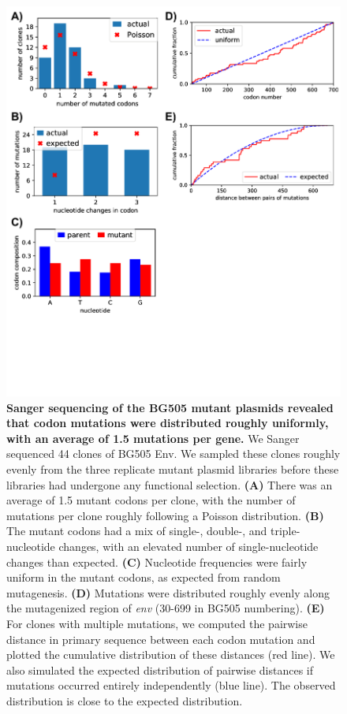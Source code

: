 \documentclass[9pt,lineno]{elife}
\begin{document}
\begin{figure}
\centerline{\includegraphics[width=5in]{figures/sanger_sequencing_supp/sanger_sequencing_supp}}
\caption{\label{suppfig:sanger_sequencing_supp}
{\bf Sanger sequencing of the BG505 mutant plasmids revealed that codon mutations were distributed roughly uniformly, with an average of 1.5 mutations per gene.}
We Sanger sequenced 44 clones of BG505 Env.
We sampled these clones roughly evenly from the three replicate mutant plasmid libraries before these libraries had undergone any functional selection. 
{\bf(A)} There was an average of 1.5 mutant codons per clone, with the number of mutations per clone roughly following a Poisson distribution. 
{\bf(B)} The mutant codons had a mix of single-, double-, and triple-nucleotide changes, with an elevated number of single-nucleotide changes than expected.
{\bf(C)} Nucleotide frequencies were fairly uniform in the mutant codons, as expected from random mutagenesis.
{\bf(D)} Mutations were distributed roughly evenly along the mutagenized region of {\it env} (30-699 in BG505 numbering).
{\bf(E)} For clones with multiple mutations, we computed the pairwise distance in primary sequence between each codon mutation and plotted the cumulative distribution of these distances (red line). 
We also simulated the expected distribution of pairwise distances if mutations occurred entirely independently (blue line). 
The observed distribution is close to the expected distribution.
}
\end{figure}
\end{document}
